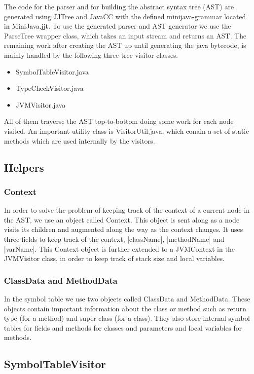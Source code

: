 \documentclass[paper=a4, fontsize=11pt]{scrartcl} %
\numberwithin{equation}{section} %
\numberwithin{figure}{section} %
\numberwithin{table}{section} %
\begin{document}
The code for the parser and for building the abstract syntax tree (AST) are generated using JJTree and JavaCC with the defined minijava-grammar located in MiniJava.jjt.
To use the generated parser and AST generator we use the ParseTree wrapper class, which takes an input stream and returns an AST.
The remaining work after creating the AST up until generating the java bytecode, is mainly handled by the following three tree-visitor classes.
\begin{itemize}
  \item{SymbolTableVisitor.java}
  \item{TypeCheckVisitor.java}
  \item{JVMVisitor.java}
\end{itemize}
All of them traverse the AST top-to-bottom doing some work for each node visited.
An important utility class is VisitorUtil.java, which conain a set of static methods which are used internally by the visitors.

\subsection{Helpers}

\subsubsection*{Context}

In order to solve the problem of keeping track of the context of a current node in the AST, we use an object called Context.
This object is sent along as a node visits its children and augmented along the way as the context changes.
It uses three fields to keep track of the context, |className|, |methodName| and |varName|.
This Context object is further extended to a JVMContext in the JVMVisitor class, in order to keep track of stack size and local variables.

\subsubsection*{ClassData and MethodData}

In the symbol table we use two objects called ClassData and MethodData.
These objects contain important information about the class or method such as return type (for a method) and super class (for a class).
They also store internal symbol tables for fields and methods for classes and parameters and local variables for methods.

\subsection{SymbolTableVisitor}
\end{document}
